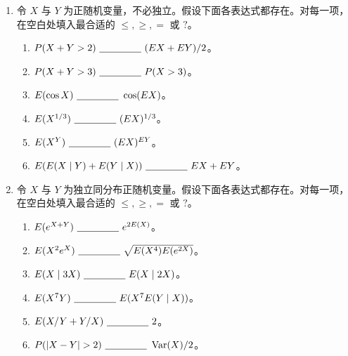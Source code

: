 \documentclass[UTF8,12pt,a4paper,fontset=fandol]{ctexart}
\begin{document}
\begin{enumerate}
  \item 令 $X$ 与 $Y$ 为正随机变量，不必独立。假设下面各表达式都存在。对每一项，在空白处填入最合适的 $\le,\ge,=$ 或 $?$。
  \begin{enumerate}
    \item $P(X+Y>2)\ \underline{\hspace{1.5cm}}\ (EX+EY)/2$。
    \item $P(X+Y>3)\ \underline{\hspace{1.5cm}}\ P(X>3)$。
    \item $E(\cos X)\ \underline{\hspace{1.5cm}}\ \cos(EX)$。
    \item $E(X^{1/3})\ \underline{\hspace{1.5cm}}\ (EX)^{1/3}$。
    \item $E(X^Y)\ \underline{\hspace{1.5cm}}\ (EX)^{EY}$。
    \item $E(E(X\mid Y)+E(Y\mid X))\ \underline{\hspace{1.5cm}}\ EX+EY$。
  \end{enumerate}

  \item 令 $X$ 与 $Y$ 为独立同分布正随机变量。假设下面各表达式都存在。对每一项，在空白处填入最合适的 $\le,\ge,=$ 或 $?$。
  \begin{enumerate}
    \item $E(e^{X+Y})\ \underline{\hspace{1.5cm}}\ e^{2E(X)}$。
    \item $E(X^2e^X)\ \underline{\hspace{1.5cm}}\ \sqrt{E(X^4)E(e^{2X})}$。
    \item $E(X\mid 3X)\ \underline{\hspace{1.5cm}}\ E(X\mid 2X)$。
    \item $E(X^7Y)\ \underline{\hspace{1.5cm}}\ E(X^7E(Y\mid X))$。
    \item $E(X/Y+Y/X)\ \underline{\hspace{1.5cm}}\ 2$。
    \item $P(|X-Y|>2)\ \underline{\hspace{1.5cm}}\ \operatorname{Var}(X)/2$。
  \end{enumerate}


\end{enumerate}
\end{document}
